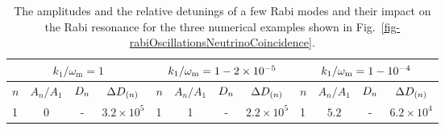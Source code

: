 
\begin{table}
\centering
\small
\setlength\tabcolsep{6pt}
\begin{tabular}{lccc|lccc|lccc}
\hline
\hline
 \multicolumn{4}{c|}{$k_1/\omega_{\mathrm m}=1$} & \multicolumn{4}{c|}{$k_1/\omega_\mathrm m=1-2\times 10^{-5}$} & \multicolumn{4}{c}{$k_1/\omega_\mathrm m=1-10^{-4}$} \\
\hline
   $n$ & $A_n/A_1$ & $D_n$  & $\Delta D_{(n)}$ & $n$ & $A_n/A_1$ & $D_n$  & $\Delta D_{(n)}$ & $n$ & $A_n/A_1$ & $D_n$  & $\Delta D_{(n)}$   \\
\hline
 1 &	0  & - &   $3.2\times10^5$   & 1 &	1 &  -  &   $2.2\times 10^5$       & 1   &	$5.2$ &  - & $6.2\times10^4$   \\
\hline
\hline
\end{tabular}
\caption{\label{table:relative-detunings-single-frequency-example}The amplitudes and the relative detunings of a few Rabi modes and their impact on the Rabi resonance for the three numerical examples shown in Fig.~\ref{fig-rabiOscillationsNeutrinoCoincidence}.}
\end{table}



